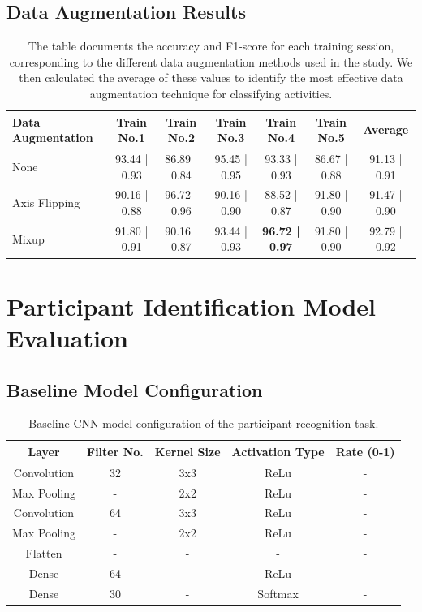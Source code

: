\documentclass{l4proj}
\begin{document}
\begin{appendices}
\subsection{Data Augmentation Results}
\begin{table}[ht]
    \centering
    \begin{tabular}{|l|c|c|c|c|c|c|}
        \hline
        \rowcolor{lightgray}
        \textbf{Data Augmentation} & \textbf{Train No.1} & \textbf{Train No.2} & \textbf{Train No.3} & \textbf{Train No.4} & \textbf{Train No.5} & \textbf{Average} \\
        \hline
        None & 93.44 | 0.93 & 86.89 | 0.84 & 95.45 | 0.95 & 93.33 | 0.93 & 86.67 | 0.88 & 91.13 | 0.91 \\
        \hline
        Axis Flipping & 90.16 | 0.88 & 96.72 | 0.96 & 90.16 | 0.90 & 88.52 | 0.87 & 91.80 | 0.90 & 91.47 | 0.90 \\
        \hline
        Mixup & 91.80 | 0.91 & 90.16 | 0.87 & 93.44 | 0.93 & \textbf{96.72 | 0.97} & 91.80 | 0.90 & 92.79 | 0.92 \\
        \hline
    \end{tabular}
    \caption{The table documents the accuracy and F1-score for each training session, corresponding to the different data augmentation methods used in the study. We then calculated the average of these values to identify the most effective data augmentation technique for classifying activities.}
    \label{tab:activity-classification-data-augmentations-evaluation}
\end{table}

\clearpage

\section{Participant Identification Model Evaluation}
\subsection{Baseline Model Configuration}
\begin{table}[h]
    \centering
    \begin{tabular}{ccccc}
        \toprule
        \textbf{Layer} & \textbf{Filter No.} & \textbf{Kernel Size} & \textbf{Activation Type} & \textbf{Rate (0-1)} \\
        \midrule
        \midrule
        Convolution & 32  & 3x3 & ReLu & - \\
        Max Pooling & - & 2x2 & ReLu & - \\
        Convolution & 64 & 3x3 & ReLu & - \\
        Max Pooling & - & 2x2 & ReLu & - \\
        Flatten & - & - & - & - \\
        Dense & 64 & - & ReLu & - \\
        Dense & 30 & - & Softmax  & - \\
        \bottomrule
    \end{tabular}
    \caption{Baseline CNN model configuration of the participant recognition task.}
    \label{tab:participant-initial-CNN-configuration}
\end{table}


\end{appendices}
\end{document}
